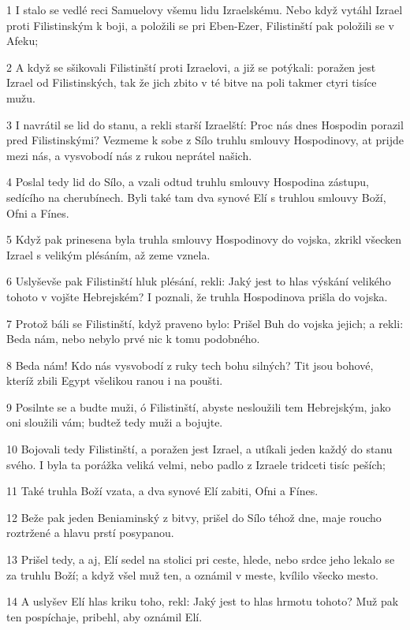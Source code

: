 \par 1 I stalo se vedlé reci Samuelovy všemu lidu Izraelskému. Nebo když vytáhl Izrael proti Filistinským k boji, a položili se pri Eben-Ezer, Filistinští pak položili se v Afeku;
\par 2 A když se sšikovali Filistinští proti Izraelovi, a již se potýkali: poražen jest Izrael od Filistinských, tak že jich zbito v té bitve na poli takmer ctyri tisíce mužu.
\par 3 I navrátil se lid do stanu, a rekli starší Izraelští: Proc nás dnes Hospodin porazil pred Filistinskými? Vezmeme k sobe z Sílo truhlu smlouvy Hospodinovy, at prijde mezi nás, a vysvobodí nás z rukou neprátel našich.
\par 4 Poslal tedy lid do Sílo, a vzali odtud truhlu smlouvy Hospodina zástupu, sedícího na cherubínech. Byli také tam dva synové Elí s truhlou smlouvy Boží, Ofni a Fínes.
\par 5 Když pak prinesena byla truhla smlouvy Hospodinovy do vojska, zkrikl všecken Izrael s velikým plésáním, až zeme vznela.
\par 6 Uslyševše pak Filistinští hluk plésání, rekli: Jaký jest to hlas výskání velikého tohoto v vojšte Hebrejském? I poznali, že truhla Hospodinova prišla do vojska.
\par 7 Protož báli se Filistinští, když praveno bylo: Prišel Buh do vojska jejich; a rekli: Beda nám, nebo nebylo prvé nic k tomu podobného.
\par 8 Beda nám! Kdo nás vysvobodí z ruky tech bohu silných? Tit jsou bohové, kteríž zbili Egypt všelikou ranou i na poušti.
\par 9 Posilnte se a budte muži, ó Filistinští, abyste nesloužili tem Hebrejským, jako oni sloužili vám; budtež tedy muži a bojujte.
\par 10 Bojovali tedy Filistinští, a poražen jest Izrael, a utíkali jeden každý do stanu svého. I byla ta porážka veliká velmi, nebo padlo z Izraele tridceti tisíc peších;
\par 11 Také truhla Boží vzata, a dva synové Elí zabiti, Ofni a Fínes.
\par 12 Beže pak jeden Beniaminský z bitvy, prišel do Sílo téhož dne, maje roucho roztržené a hlavu prstí posypanou.
\par 13 Prišel tedy, a aj, Elí sedel na stolici pri ceste, hlede, nebo srdce jeho lekalo se za truhlu Boží; a když všel muž ten, a oznámil v meste, kvílilo všecko mesto.
\par 14 A uslyšev Elí hlas kriku toho, rekl: Jaký jest to hlas hrmotu tohoto? Muž pak ten pospíchaje, pribehl, aby oznámil Elí.
